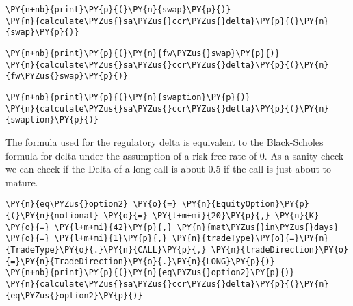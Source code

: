     \begin{tcolorbox}[breakable, size=fbox, boxrule=1pt, pad at break*=1mm,colback=cellbackground, colframe=cellborder]
\begin{Verbatim}[commandchars=\\\{\}]
\PY{n+nb}{print}\PY{p}{(}\PY{n}{swap}\PY{p}{)}
\PY{n}{calculate\PYZus{}sa\PYZus{}ccr\PYZus{}delta}\PY{p}{(}\PY{n}{swap}\PY{p}{)}
\end{Verbatim}
\end{tcolorbox}

    \begin{tcolorbox}[breakable, size=fbox, boxrule=1pt, pad at break*=1mm,colback=cellbackground, colframe=cellborder]
\begin{Verbatim}[commandchars=\\\{\}]
\PY{n+nb}{print}\PY{p}{(}\PY{n}{fw\PYZus{}swap}\PY{p}{)}
\PY{n}{calculate\PYZus{}sa\PYZus{}ccr\PYZus{}delta}\PY{p}{(}\PY{n}{fw\PYZus{}swap}\PY{p}{)}
\end{Verbatim}
\end{tcolorbox}

    \begin{tcolorbox}[breakable, size=fbox, boxrule=1pt, pad at break*=1mm,colback=cellbackground, colframe=cellborder]
\begin{Verbatim}[commandchars=\\\{\}]
\PY{n+nb}{print}\PY{p}{(}\PY{n}{swaption}\PY{p}{)}
\PY{n}{calculate\PYZus{}sa\PYZus{}ccr\PYZus{}delta}\PY{p}{(}\PY{n}{swaption}\PY{p}{)}
\end{Verbatim}
\end{tcolorbox}

    The formula used for the regulatory delta is equivalent to the
Black-Scholes formula for delta under the assumption of a risk free rate
of 0. As a sanity check we can check if the Delta of a long call is
about 0.5 if the call is just about to mature.

    \begin{tcolorbox}[breakable, size=fbox, boxrule=1pt, pad at break*=1mm,colback=cellbackground, colframe=cellborder]
\begin{Verbatim}[commandchars=\\\{\}]
\PY{n}{eq\PYZus{}option2} \PY{o}{=} \PY{n}{EquityOption}\PY{p}{(}\PY{n}{notional} \PY{o}{=} \PY{l+m+mi}{20}\PY{p}{,} \PY{n}{K} \PY{o}{=} \PY{l+m+mi}{42}\PY{p}{,} \PY{n}{mat\PYZus{}in\PYZus{}days} \PY{o}{=} \PY{l+m+mi}{1}\PY{p}{,} \PY{n}{tradeType}\PY{o}{=}\PY{n}{TradeType}\PY{o}{.}\PY{n}{CALL}\PY{p}{,} \PY{n}{tradeDirection}\PY{o}{=}\PY{n}{TradeDirection}\PY{o}{.}\PY{n}{LONG}\PY{p}{)}
\PY{n+nb}{print}\PY{p}{(}\PY{n}{eq\PYZus{}option2}\PY{p}{)}
\PY{n}{calculate\PYZus{}sa\PYZus{}ccr\PYZus{}delta}\PY{p}{(}\PY{n}{eq\PYZus{}option2}\PY{p}{)}
\end{Verbatim}
\end{tcolorbox}

